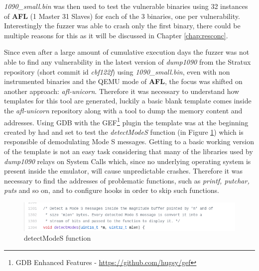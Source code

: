 \documentclass[../main.tex]{subfiles}
\begin{document}
\textit{1090\_small.bin} was then used to test the vulnerable binaries using 32
instances of \textbf{AFL} (1 Master 31 Slaves) for each of the 3 binaries, one
per vulnerability. Interestingly the fuzzer was able to crash only the first
binary, there could be multiple reasons for this as it will be discussed in
Chapter \ref{chap:resconc}.

Since even after a large amount of cumulative execution days the fuzzer was not
able to find any vulnerability in the latest version of \textit{dump1090} from
the Stratux repository (short commit id \textit{cbf122f}) using
\textit{1090\_small.bin}, even with non instrumented binaries and the QEMU mode
of \textbf{AFL}, the focus was shifted on another approach: \textit{afl-unicorn}.
Therefore it was necessary to understand how templates for this tool are
generated, luckily a basic blank template comes inside the \textit{afl-unicorn}
repository along with a tool to dump the memory content and addresses. Using GDB
with the GEF\footnote{GDB Enhanced Features - \url{https://github.com/hugsy/gef}}
plugin the template was at the beginning created by had and set to test the
\textit{detectModeS} function (in Figure \ref{fig:detectms}) which is
responsible of demodulating Mode S messages. Getting to a basic working version
of the template is not an easy task considering that many of the libraries used by \textit{dump1090} relays on System Calls which, since no underlying operating
system is present inside the emulator, will cause unpredictable crashes.
Therefore it was necessary to find the addresses of problematic functions, such
as \textit{printf, putchar, puts} and so on, and to configure hooks in order to
skip such functions.

\begin{figure}[htp]
  \centering
  \includegraphics[scale=0.9]{images/detectModeS.png}
  \caption{detectModeS function}
  \label{fig:detectms}
\end{figure}
\end{document}
